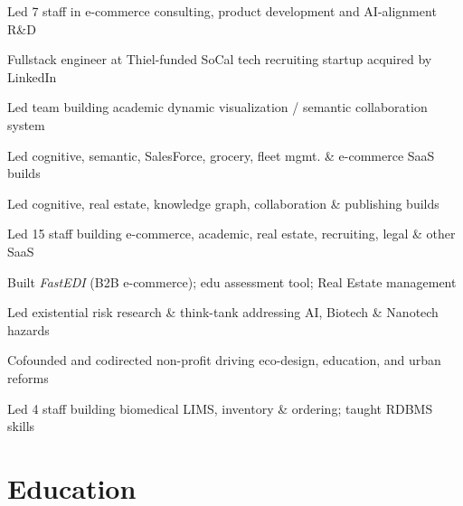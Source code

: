 \documentclass[line,margin,hidelinks]{res}
\begin{document}

\begin{position}
Led 7 staff in e-commerce consulting, product development and AI-alignment R\&D
\end{position}

\parskip=3.5pt %


\begin{position}
Fullstack engineer at Thiel-funded SoCal tech recruiting startup acquired by LinkedIn
\end{position}


\begin{position}
Led team building academic dynamic visualization / semantic collaboration system
\end{position}


\begin{position}
Led cognitive, semantic, SalesForce, grocery, fleet mgmt. \& e-commerce SaaS builds
\end{position}


\begin{position}
Led cognitive, real estate, knowledge graph, collaboration \& publishing builds
\end{position}


\begin{position}
Led 15 staff building e-commerce, academic, real estate, recruiting, legal \& other SaaS
\end{position}


\begin{position}
Built \textit{FastEDI} (B2B e-commerce);
edu assessment tool;
Real Estate management
\end{position}


\begin{position}
  Led existential risk research \& think-tank addressing AI,
  Biotech \& Nanotech hazards
\end{position}


\begin{position}
  Cofounded and codirected non-profit driving eco-design, education,
  and urban reforms
\end{position}


\begin{position}
  Led 4 staff building biomedical LIMS, inventory \& ordering; taught RDBMS skills
\end{position}



\section{Education}
\small{  }
\end{document}
